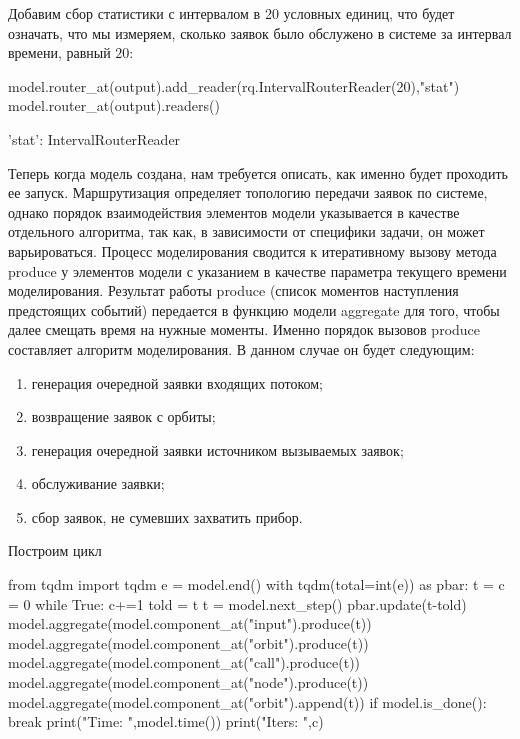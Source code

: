 Добавим сбор статистики с интервалом в 20 условных единиц, что будет означать, что мы измеряем, сколько заявок было обслужено в системе за интервал времени, равный $20$:

\begin{pyin}
model.router_at(output).add_reader(rq.IntervalRouterReader(20),"stat")
model.router_at(output).readers()
\end{pyin}
\begin{pyout}
'stat': IntervalRouterReader
\end{pyout}

Теперь когда модель создана, нам требуется описать, как именно будет проходить ее запуск. Маршрутизация определяет топологию передачи заявок по системе, однако порядок взаимодействия элементов модели указывается в качестве отдельного алгоритма, так как, в зависимости от специфики задачи, он может варьироваться.
Процесс моделирования сводится к итеративному вызову метода produce у элементов модели с указанием в качестве параметра текущего времени моделирования. Результат работы produce (список моментов наступления предстоящих событий) передается в функцию модели aggregate для того, чтобы далее смещать время на нужные моменты. Именно порядок вызовов produce составляет алгоритм моделирования. В данном случае он будет следующим:
\begin{enumerate}
	\item генерация очередной заявки входящих потоком;
	\item возвращение заявок с орбиты;
	\item генерация очередной заявки источником вызываемых заявок;
	\item обслуживание заявки;
	\item сбор заявок, не сумевших захватить прибор.
\end{enumerate}

Построим цикл
\begin{pyin}
from tqdm import tqdm
e = model.end()
with tqdm(total=int(e)) as pbar:     
t = c = 0
while True:
    c+=1 
    told = t
    t = model.next_step()
    pbar.update(t-told)
    model.aggregate(model.component_at("input").produce(t))
    model.aggregate(model.component_at("orbit").produce(t))
    model.aggregate(model.component_at("call").produce(t))
    model.aggregate(model.component_at("node").produce(t))
    model.aggregate(model.component_at("orbit").append(t))
    if model.is_done():
        break
print("Time: ",model.time())
print("Iters: ",c)
\end{pyin}

